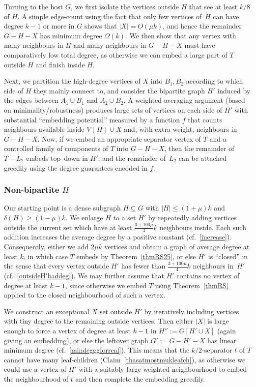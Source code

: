 \documentclass[12pt]{article}
\begin{document}
Turning to the host $G$, we first isolate the vertices outside $H$ that see at least $k/8$ of $H$.
A simple edge-count using the fact that only few vertices of~$H$ can have degree $k-1$ or more in $G$
shows that $|X|=O(\mu k)$, and hence the remainder $G-H-X$ has minimum degree $\Omega(k)$.
We then show that any vertex with  many neighbours in $H$ and many neighbours in $G-H-X$
must have comparatively low total degree, as otherwise we can embed a large part of $T$ outside $H$ and
finish inside $H$.

Next, we partition the high-degree vertices of $X$ into $B_1,B_2$ according to which side of $H$
they mainly connect to, and consider the bipartite graph $H'$ induced by the edges between
$A_1\cup B_1$ and $A_2\cup B_2$.
A weighted averaging argument (based on minimality/robustness) produces large sets of vertices on each
side of $H'$ with substantial ``embedding potential'' measured by a function $f$ that counts neighbours
available inside $V(H)\cup X$ and, with extra weight, neighbours in $G-H-X$.
Now, if we embed an appropriate separator vertex of $T$ and a
controlled family of components of $T$ into $G-H-X$, then the remainder of $T-L_2$ embeds top--down
in $H'$, and the remainder of~$L_2$ can be attached greedily using the degree
guarantees encoded in $f$.



\subsubsection{Non-bipartite $H$}
Our starting point is a dense subgraph $H\subseteq G$ with $|H|\le (1+\mu)k$ and $\delta(H)\ge (1-\mu)k$.
We   enlarge $H$ to a set $H'$ by repeatedly adding vertices outside the current set which have at least
$\frac{3+100\mu}{4}k$ neighbours inside. Each such addition increases the average degree by a positive constant
(cf.~\eqref{increase}). Consequently, either we add $2\mu k$ vertices and obtain a graph of average degree at least $k$,
in which case $T$ embeds by Theorem~\ref{thmRS25}, or else $H'$ is ``closed'' in the sense that every vertex
outside $H'$ has fewer than $\frac{3+100\mu}{4}k$ neighbours in~$H'$ (cf.~\eqref{outsideH'baddeg}).
We may further assume that $H'$ contains no vertex of degree at least $k-1$, since otherwise we embed $T$
using Theorem~\ref{thmRS} applied to the closed neighbourhood of such a vertex.

We construct an exceptional $X$ set outside $H'$ by iteratively including  vertices with tiny degree to the remaining outside vertices. Then either
$|X|$ is  large enough to force a vertex of degree at least $k-1$ in $H'':=G[H'\cup X]$ (again giving an embedding), or else
the leftover graph $G':=G-H'-X$ has linear minimum degree (cf.~\eqref{mindegggforreal}).
This means that the $k/2$-separator $t$ of $T$  cannot have many leaf-children
(Claim~\ref{thasatmostmukleafch}), as otherwise we could use a vertex of $H'$ with a suitably large weighted neighbourhood
to embed the neighbourhood of $t$ and then complete the embedding greedily.
\end{document}
